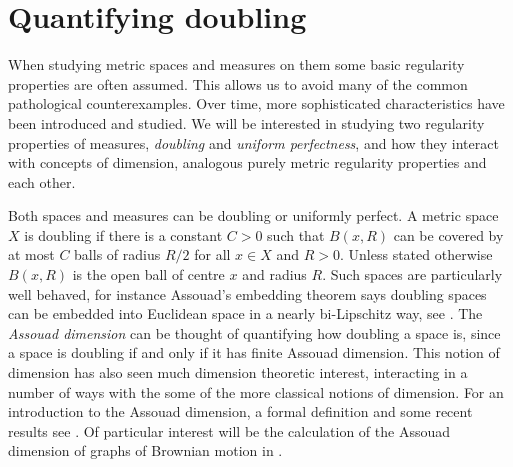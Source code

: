 \chapter{Quantifying doubling}
\label{chap:quantifying}

When studying metric spaces and measures on them some basic regularity properties are often assumed. This allows us to avoid many of the common pathological counterexamples. Over time, more sophisticated characteristics have been introduced and studied. We will be interested in studying two regularity properties of measures, \textit{doubling} and \textit{uniform perfectness}, and how they interact with concepts of dimension, analogous purely metric regularity properties and each other.

Both spaces and measures can be doubling or uniformly perfect. A metric space $X$ is doubling if there is a constant $C > 0$ such that $B(x,R)$ can be covered by at most $C$ balls of radius $R/2$ for all $x\in X$ and $R > 0$. Unless stated otherwise $B(x,R)$ is the open ball of centre $x$ and radius $R$. Such spaces are particularly well behaved, for instance Assouad's embedding theorem says doubling spaces can be embedded into Euclidean space in a nearly bi-Lipschitz way, see \cite{assouad}. The \textit{Assouad dimension} can be thought of quantifying how doubling a space is, since a space is doubling if and only if it has finite Assouad dimension. This notion of dimension has also seen much dimension theoretic interest, interacting in a number of ways with the some of the more classical notions of dimension. For an introduction to the Assouad dimension, a formal definition and some recent results see \cite{fraser, microsets, orponen, robinson}. Of particular interest will be the calculation of the Assouad dimension of graphs of Brownian motion in \cite{howroyd-yu}.

